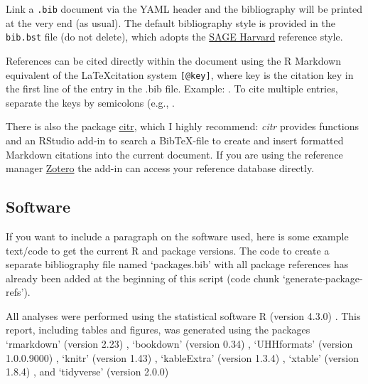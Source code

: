 \documentclass[
11pt,
a4paper]{article}
\begin{document}
Link a \texttt{.bib} document via the YAML header and the bibliography
will be printed at the very end (as usual). The default bibliography
style is provided in the \texttt{bib.bst} file (do not delete), which
adopts the
\href{https://uk.sagepub.com/sites/default/files/sage_harvard_reference_style_0.pdf}{SAGE
Harvard} reference style.

References can be cited directly within the document using the R
Markdown equivalent of the \LaTeX citation system \texttt{{[}@key{]}},
where key is the citation key in the first line of the entry in the .bib
file. Example: \citep{Taylor1937}. To cite multiple entries, separate
the keys by semicolons (e.g., \citep{Knupp1999, Kamm2000}.

There is also the package \href{https://github.com/crsh/citr}{citr},
which I highly recommend: \emph{citr} provides functions and an RStudio
add-in to search a BibTeX-file to create and insert formatted Markdown
citations into the current document. If you are using the reference
manager \href{https://www.zotero.org/}{Zotero} the add-in can access
your reference database directly.

\hypertarget{software}{%
\subsection{Software}\label{software}}

If you want to include a paragraph on the software used, here is some
example text/code to get the current R and package versions. The code to
create a separate bibliography file named `packages.bib' with all
package references has already been added at the beginning of this
script (code chunk `generate-package-refs').

All analyses were performed using the statistical software R (version
4.3.0) \citep{R-base}. This report, including tables and figures, was
generated using the packages `rmarkdown' (version 2.23)
\citep{R-rmarkdown}, `bookdown' (version 0.34) \citep{R-bookdown},
`UHHformats' (version 1.0.0.9000) \citep{R-UHHformats}, `knitr' (version
1.43) \citep{R-knitr}, `kableExtra' (version 1.3.4)
\citep{R-kableExtra}, `xtable' (version 1.8.4) \citep{R-xtable}, and
`tidyverse' (version 2.0.0) \citep{R-tidyverse}

\clearpage

  
  
\end{document}
